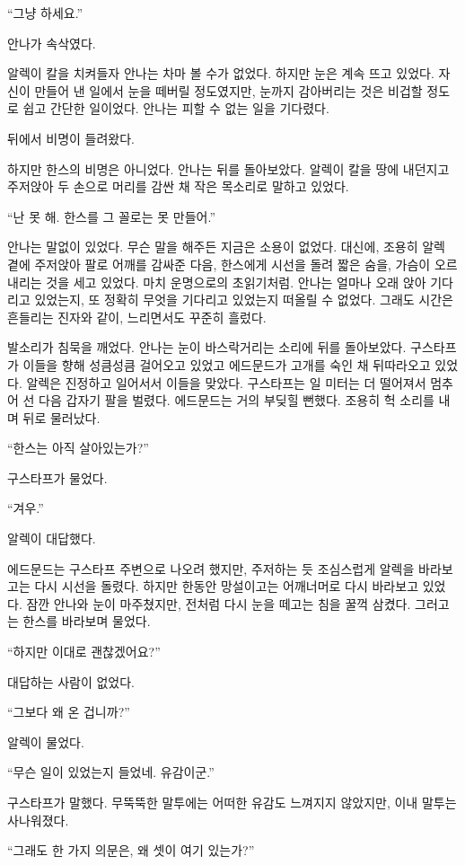 ``그냥 하세요.''

안나가 속삭였다.

알렉이 칼을 치켜들자 안나는 차마 볼 수가 없었다. 하지만 눈은 계속 뜨고 있었다. 자신이 만들어 낸 일에서 눈을 떼버릴 정도였지만, 눈까지 감아버리는 것은 비겁할 정도로 쉽고 간단한 일이었다. 안나는 피할 수 없는 일을 기다렸다.

뒤에서 비명이 들려왔다.

하지만 한스의 비명은 아니었다. 안나는 뒤를 돌아보았다. 알렉이 칼을 땅에 내던지고 주저앉아 두 손으로 머리를 감싼 채 작은 목소리로 말하고 있었다.

``난 못 해. 한스를 그 꼴로는 못 만들어.''

안나는 말없이 있었다. 무슨 말을 해주든 지금은 소용이 없었다. 대신에, 조용히 알렉 곁에 주저앉아 팔로 어깨를 감싸준 다음, 한스에게 시선을 돌려 짧은 숨을, 가슴이 오르내리는 것을 세고 있었다. 마치 운명으로의 초읽기처럼. 안나는 얼마나 오래 앉아 기다리고 있었는지, 또 정확히 무엇을 기다리고 있었는지 떠올릴 수 없었다. 그래도 시간은 흔들리는 진자와 같이, 느리면서도 꾸준히 흘렀다.

발소리가 침묵을 깨었다. 안나는 눈이 바스락거리는 소리에 뒤를 돌아보았다. 구스타프가 이들을 향해 성큼성큼 걸어오고 있었고 에드문드가 고개를 숙인 채 뒤따라오고 있었다. 알렉은 진정하고 일어서서 이들을 맞았다. 구스타프는 일 미터는 더 떨어져서 멈추어 선 다음 갑자기 팔을 벌렸다. 에드문드는 거의 부딪힐 뻔했다. 조용히 헉 소리를 내며 뒤로 물러났다.

``한스는 아직 살아있는가?''

구스타프가 물었다.

``겨우.''

알렉이 대답했다.

에드문드는 구스타프 주변으로 나오려 했지만, 주저하는 듯 조심스럽게 알렉을 바라보고는 다시 시선을 돌렸다. 하지만 한동안 망설이고는 어깨너머로 다시 바라보고 있었다. 잠깐 안나와 눈이 마주쳤지만, 전처럼 다시 눈을 떼고는 침을 꿀꺽 삼켰다. 그러고는 한스를 바라보며 물었다.

``하지만 이대로 괜찮겠어요?''

대답하는 사람이 없었다.

``그보다 왜 온 겁니까?''

알렉이 물었다.

``무슨 일이 있었는지 들었네. 유감이군.''

구스타프가 말했다. 무뚝뚝한 말투에는 어떠한 유감도 느껴지지 않았지만, 이내 말투는 사나워졌다.

``그래도 한 가지 의문은, 왜 셋이 여기 있는가?''

